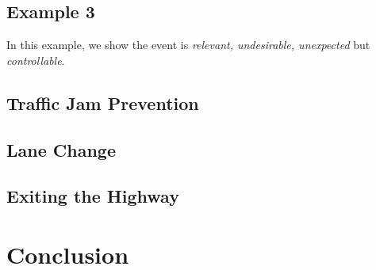 \documentclass[journal, 11pt]{IEEEtran}
\begin{document}
\subsection{Example 3}
In this example, we show the event is \textit{relevant, undesirable, unexpected}
but \textit{controllable}.\\

\subsection{Traffic Jam Prevention}
\label{sec:lane-change}

\subsection{Lane Change}
\label{sec:lane-change}

\subsection{Exiting the Highway}
\label{sec:exit-highway}

\section{Conclusion}
\label{Conc}
%



% 
\end{document}
